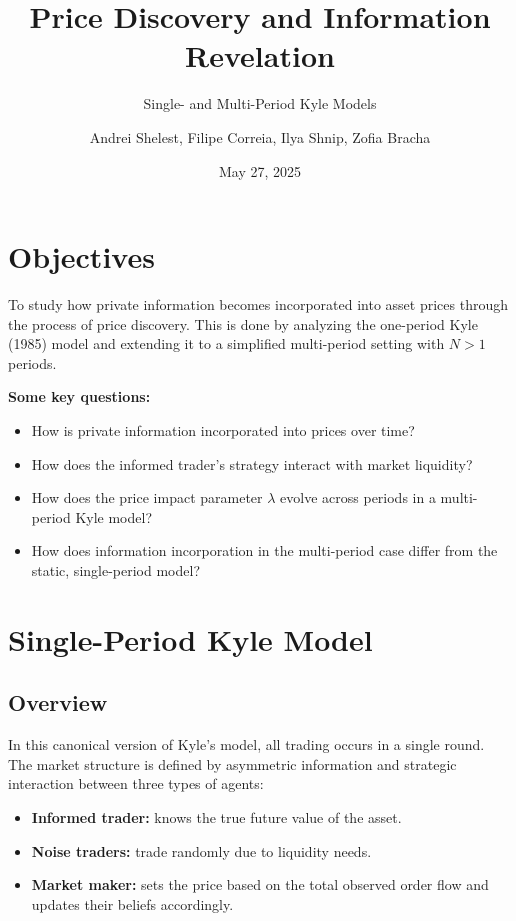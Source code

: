 \documentclass{beamer}
\title[Single- and Multi-Period Kyle Models]{Price Discovery and Information Revelation}
\subtitle{Single- and Multi-Period Kyle Models}
\author{Andrei Shelest, Filipe Correia, Ilya Shnip, Zofia Bracha}
\date{May 27, 2025}
\begin{document}
\begin{frame}
  \titlepage
\end{frame}

\section{Objectives}
\begin{frame}
To study how private information becomes incorporated into asset prices through the process of price discovery.
This is done by analyzing the one-period Kyle (1985) model and extending it to a simplified multi-period setting with \( N > 1 \) periods.

\vspace{1em}
\textbf{Some key questions:}
\begin{itemize}
    \item How is private information incorporated into prices over time?
    \item How does the informed trader’s strategy interact with market liquidity?
    \item How does the price impact parameter \( \lambda \) evolve across periods in a multi-period Kyle model?
    \item How does information incorporation in the multi-period case differ from the static, single-period model?
\end{itemize}
\end{frame}


\section{Single-Period Kyle Model}
\subsection{Overview}
\begin{frame}
In this canonical version of Kyle’s model, all trading occurs in a single round. The market structure is defined by asymmetric information and strategic interaction between three types of agents:

\vspace{1em}

\begin{itemize}
    \item \textbf{Informed trader:} knows the true future value of the asset.
    \item \textbf{Noise traders:} trade randomly due to liquidity needs.
    \item \textbf{Market maker:} sets the price based on the total observed order flow and updates their beliefs accordingly.
\end{itemize}
\end{frame}
\end{document}
